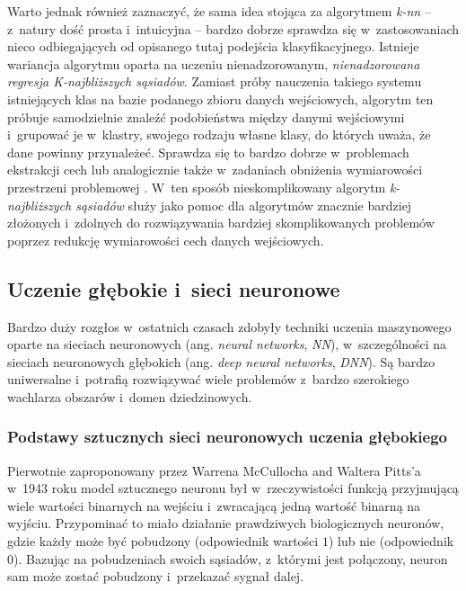 \begin{itemize}
        Warto jednak również zaznaczyć, że sama idea stojąca za algorytmem \emph{k-nn} -- z~natury dość prosta i~intuicyjna -- bardzo dobrze sprawdza się w~zastosowaniach nieco odbiegających od opisanego tutaj podejścia klasyfikacyjnego.
        Istnieje wariancja algorytmu oparta na uczeniu nienadzorowanym, \emph{nienadzorowana regresja K-najbliższych sąsiadów}.
        Zamiast próby nauczenia takiego systemu istniejących klas na bazie podanego zbioru danych wejściowych, algorytm ten próbuje samodzielnie znaleźć podobieństwa między danymi wejściowymi i~grupować je w~klastry, swojego rodzaju własne klasy, do których uważa, że dane powinny przynależeć.
        Sprawdza się to bardzo dobrze w~problemach ekstrakcji cech lub analogicznie także w~zadaniach obniżenia wymiarowości przestrzeni problemowej \cite{wang2015accelerating}.
        W~ten sposób nieskomplikowany algorytm \emph{k-najbliższych sąsiadów} służy jako pomoc dla algorytmów znacznie bardziej złożonych i~zdolnych do rozwiązywania bardziej skomplikowanych problemów poprzez redukcję wymiarowości cech danych wejściowych.

\end{itemize}

\subsection{Uczenie głębokie i~sieci neuronowe}
\label{sec:deep-learning}

Bardzo duży rozgłos w~ostatnich czasach zdobyły techniki uczenia maszynowego oparte na sieciach neuronowych (ang. \emph{neural networks}, \emph{NN}), w~szczególności na sieciach neuronowych głębokich (ang. \emph{deep neural networks}, \emph{DNN}).
Są bardzo uniwersalne i~potrafią rozwiązywać wiele problemów z~bardzo szerokiego wachlarza obszarów i~domen dziedzinowych.

\subsubsection{Podstawy sztucznych sieci neuronowych uczenia głębokiego}

Pierwotnie zaproponowany przez Warrena McCullocha and Waltera Pitts'a w~1943 roku \cite{mcculloch1943logical} model sztucznego neuronu był w~rzeczywistości funkcją przyjmującą wiele wartości binarnych na wejściu i~zwracającą jedną wartość binarną na wyjściu.
Przypominać to miało działanie prawdziwych biologicznych neuronów, gdzie każdy może być pobudzony (odpowiednik wartości $1$) lub nie (odpowiednik $0$).
Bazując na pobudzeniach swoich sąsiadów, z~którymi jest połączony, neuron sam może zostać pobudzony i~przekazać sygnał dalej.

